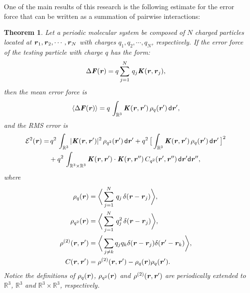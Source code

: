 \documentclass[aps,pre,preprint,unsortedaddress]{revtex4}
\newcommand{\redc}[1]{{\color{red} #1}}
\renewcommand{\v}[1]{\textbf{\textit{#1}}}
\renewcommand{\d}[1]{\textsf{#1}}
\newtheorem{theorem}{Theorem}[section]
\begin{document}
One of the main results of this research is the \redc{following} estimate for
the error force that can be written as a summation of
pairwise interactions:
\begin{theorem}\label{thm:tmp1}
  Let a periodic molecular system be composed of $N$ charged particles
  located at $\v r_1, \v r_2, \cdots, \v r_N$ with charges $q_1, q_2,
  \cdots, q_N$, respectively.
  If the error force of the testing particle with charge $q$ has the form:
  \begin{align}\label{eqn:thm-error-force}
    \Delta \v F(\v r) =
    q\sum_{j=1}^N\,q_j \v K(\v r, \v r_j),
  \end{align}
  then the mean error force is
  \begin{align}\label{eqn:thm-meanf}
    \langle\Delta\v F(\v r)\rangle
    =q\, \int_{\mathbb R^3}\v K (\v r,\v r')\,\rho_q(\v r')\,\d d\v r',
  \end{align}
  and the RMS error is
  \begin{align}\nonumber
    \mathcal E^2 (\v r) 
    = &\,
    q^2\,\int_{\mathbb R^3}\vert\v K(\v r,\v r')\vert^2\,\rho_{q^2} (\v r')\,\d d\v r' + 
    q^2\,
    \big[
    \int_{\mathbb R^3}\v K(\v r,\v r')\,\rho_{q}(\v r')\,\d d\v r'
    \,\big]^2
    \\\label{eqn:thm-error}
    &+
    q^2\,\int_{\mathbb R^3\times\mathbb R^3}
    \v K(\v r,\v r')\cdot
    \v K(\v r,\v r'')\,
    C_{q^2}(\v r', \v r'')\,
    \d d\v r'\d d\v r'',
  \end{align}
  where
  \begin{align}\label{eqn:def-rhoq}
    \rho_q(\v r)
    &= 
    \bigg\langle
    \sum_{j = 1}^N
    \,q_j\,\delta(\v r - \v r_j)
    \bigg\rangle,\\\label{eqn:def-rhoq2}
    \rho_{q^2}(\v r)
    &= 
    \bigg\langle
    \sum_{j = 1}^N
    \,q^2_j\,\delta(\v r - \v r_j)
    \bigg\rangle,\\\label{eqn:def-rho2}
    \rho^{(2)}(\v r, \v r')
    &= 
    \bigg\langle
    \sum_{j\neq k}
    q_jq_k\delta(\v r-\v r_j)\delta(\v r'-\v r_k)
    \bigg\rangle,\\\label{eqn:def-c}
    C(\v r, \v r')
    &=
    \rho^{(2)}(\v r, \v r')    
    - \rho_q(\v r)\rho_q(\v r').
  \end{align}
  Notice the definitions of $\rho_q(\v r)$, $\rho_{q^2}(\v r)$ and
  $\rho^{(2)}(\v r, \v r')$ are periodically extended to
  $\mathbb{R}^3$, $\mathbb{R}^3$ and $\mathbb{R}^3\times\mathbb R^3$,
  respectively.
\end{theorem}
\end{document}
